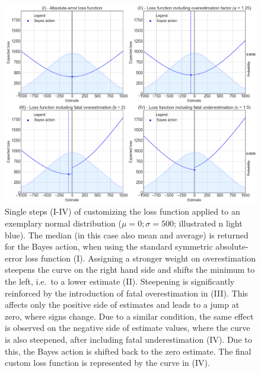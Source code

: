 		\begin{figure}[p!]
			\centering
			\includegraphics[width=1\textwidth]{Figures/LF_4steps_normal2.png}
			\caption{Single steps (I-IV) of customizing the loss function applied to an exemplary normal distribution ($\mu=0; \sigma=500$; illustrated n light blue). The median (in this case also mean and average) is returned for the Bayes action, when using the standard symmetric absolute-error loss function (I). Assigning a stronger weight on overestimation steepens the curve on the right hand side and shifts the minimum to the left, i.e.\ to a lower estimate (II). Steepening is significantly reinforced by the introduction of fatal overestimation in (III). This affects only the positive side of estimates and leads to a jump at zero, where signs change. Due to a similar condition, the same effect is observed on the negative side of estimate values, where the curve is also steepened, after including fatal underestimation (IV). Due to this, the Bayes action is shifted back to the zero estimate. The final custom loss function is represented by the curve in (IV).}\label{fig:LF_4steps_normal}
			\centering
		\end{figure}		
